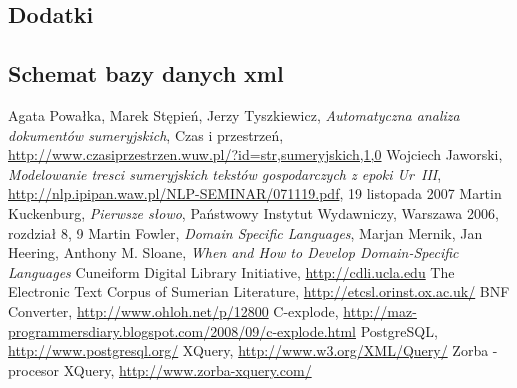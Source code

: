 \documentclass{pracamgr}
\begin{document}
\begin{appendix}
\part*{Dodatki}

\chapter{Schemat bazy danych xml}
\label{appendix:xmlsch}





\end{appendix}

\begin{thebibliography}{99}
 Agata Powałka, Marek Stępień, Jerzy Tyszkiewicz, \textit{Automatyczna analiza dokumentów sumeryjskich}, 
Czas i przestrzeń, \url{http://www.czasiprzestrzen.wuw.pl/?id=str,sumeryjskich,1,0}
 Wojciech Jaworski, \textit{Modelowanie tresci sumeryjskich tekstów gospodarczych z epoki Ur~III}, 
\url{http://nlp.ipipan.waw.pl/NLP-SEMINAR/071119.pdf}, 19 listopada 2007
 Martin Kuckenburg, \textit{Pierwsze słowo}, Państwowy Instytut Wydawniczy, Warszawa 2006, rozdział 8, 9
 Martin Fowler, \textit{Domain Specific Languages}, %
 Marjan Mernik, Jan Heering, Anthony M. Sloane, \textit{When and How to Develop Domain-Specific Languages}
 Cuneiform Digital Library Initiative, \url{http://cdli.ucla.edu}
 The Electronic Text Corpus of Sumerian Literature, \url{http://etcsl.orinst.ox.ac.uk/}
 BNF Converter, \url{http://www.ohloh.net/p/12800} %
 C-explode, \url{http://maz-programmersdiary.blogspot.com/2008/09/c-explode.html}
 PostgreSQL, \url{http://www.postgresql.org/}
 XQuery, \url{http://www.w3.org/XML/Query/}
 Zorba - procesor XQuery, \url{http://www.zorba-xquery.com/}



\end{thebibliography}

\listoffigures
\end{document}
